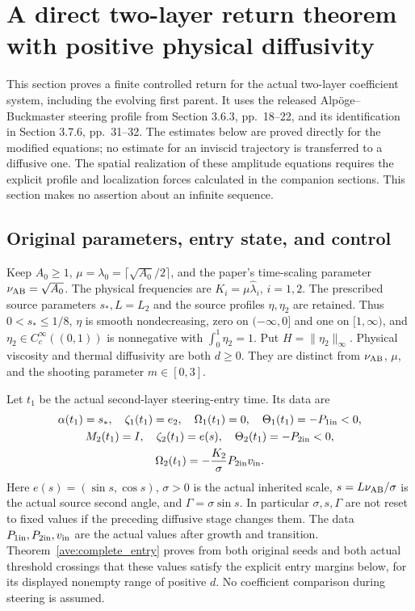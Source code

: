 \section{A direct two-layer return theorem with positive physical diffusivity}
\label{sr:section}

This section proves a finite controlled return for the actual two-layer
coefficient system, including the evolving first parent. It uses the
released Alp\"oge--Buckmaster steering profile from Section 3.6.3,
pp.~18--22, and its identification in Section 3.7.6, pp.~31--32.
The estimates below are proved directly for the modified equations;
no estimate for an inviscid trajectory is transferred to a diffusive one.
The spatial realization of these amplitude equations requires the
explicit profile and localization forces calculated in the companion
sections. This section makes no assertion about an infinite sequence.

\subsection{Original parameters, entry state, and control}

Keep $A_0\geq1$, $\mu=\lambda_0=\lceil\sqrt{A_0}/2\rceil$,
and the paper's time-scaling parameter $\nu_{\rm AB}=\sqrt{A_0}$.
The physical frequencies are $K_i=\mu\widehat\lambda_i$, $i=1,2$.
The prescribed source parameters $s_*,L=L_2$ and the source profiles
$\eta,\eta_2$ are retained. Thus $0<s_*\leq1/8$,
$\eta$ is smooth nondecreasing, zero on $(-\infty,0]$ and one on
$[1,\infty)$, and $\eta_2\in C_c^\infty((0,1))$ is nonnegative with
$\int_0^1\eta_2=1$. Put $H=\|\eta_2\|_\infty$.
Physical viscosity and thermal diffusivity are both $d\geq0$.
They are distinct from $\nu_{\rm AB}$, $\mu$, and the shooting parameter
$m\in[0,3]$.

Let $t_1$ be the actual second-layer steering-entry time. Its data are
\begin{equation}\label{sr:entry}
 \begin{gathered}
 \alpha(t_1)=s_*,\quad \zeta_1(t_1)=e_2,\quad
 \Omega_1(t_1)=0,\quad \Theta_1(t_1)=-P_{1\rm in}<0,\\
 M_2(t_1)=I,\quad \zeta_2(t_1)=e(s),\quad
 \Theta_2(t_1)=-P_{2\rm in}<0,\\
 \Omega_2(t_1)=-\frac{K_2}{\sigma}P_{2\rm in}v_{\rm in}.
 \end{gathered}
\end{equation}
Here $e(s)=(\sin s,\cos s)$, $\sigma>0$ is the actual inherited scale,
$s=L\nu_{\rm AB}/\sigma$ is the actual source second angle, and
$\Gamma=\sigma\sin s$. In particular $\sigma,s,\Gamma$ are not
reset to fixed values if the preceding diffusive stage changes them.
The data $P_{1\rm in},P_{2\rm in},v_{\rm in}$ are the actual values
after growth and transition. Theorem~\ref{ave:complete_entry} proves
from both original seeds and both actual threshold crossings that these
values satisfy the explicit entry margins below, for its displayed
nonempty range of positive $d$. No coefficient comparison during
steering is assumed.

